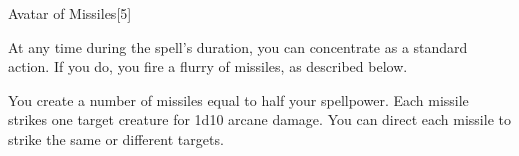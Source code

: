 \begin{spellsection}{Avatar of Missiles}[5]
    \begin{spellheader}
    \end{spellheader}
    \begin{spellcontent}
        \begin{spelltargetinginfo}
        \end{spelltargetinginfo}
        \begin{spelleffects}
            \spelleffect At any time during the spell's duration, you can concentrate as a standard action. If you do, you fire a flurry of missiles, as described below.
            \spelldur \durlong
        \end{spelleffects}
    \end{spellcontent}
    \begin{spellsubcontent}
        \begin{spelltargetinginfo}
        \end{spelltargetinginfo}
        \begin{spelleffects}
            \spelleffect You create a number of missiles equal to half your spellpower. Each missile strikes one target creature for 1d10 arcane damage. You can direct each missile to strike the same or different targets.
        \end{spelleffects}
    \end{spellsubcontent}
    \begin{spellfooter}
        \miscastexplode
    \end{spellfooter}
    \begin{spellaugments}
    \end{spellaugments}
\end{spellsection}

